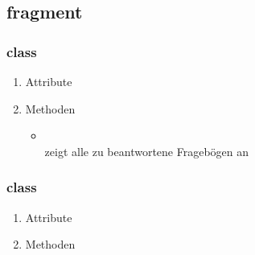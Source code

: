 \documentclass[a4paper]{scrreprt}
\begin{document}
{\begin{enumerate}
                \end{enumerate}

            \subsection{fragment}

                \subsubsection{class }
                \begin{enumerate}
                \item Attribute
                \item Methoden
                     \begin{itemize}
                        \item {\large {}}\\
                            zeigt alle zu beantwortene Fragebögen an
                     \end{itemize}
                \end{enumerate}

                \subsubsection{class }
                 \begin{enumerate}
                        \item Attribute
                        \item Methoden
                \end{enumerate}


}
\end{document}

